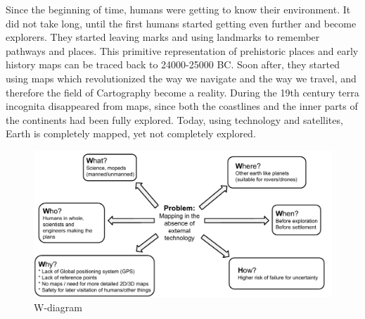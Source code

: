 Since the beginning of time, humans were getting to know their environment. It did not take long, until the first humans started getting even further and become explorers. They started leaving marks and using landmarks to remember pathways and places. This primitive representation of prehistoric places and early history maps can be traced back to 24000-25000 BC. Soon after, they started using maps which revolutionized the way we navigate and the way we travel, and therefore the field of Cartography become a reality. During the 19th century terra incognita disappeared from maps, since both the coastlines and the inner parts of the continents had been fully explored. Today, using technology and satellites, Earth is completely mapped, yet not completely explored.


\begin{figure}[!htb]
	\centering
	\includegraphics[scale=.7]{images/wdiagram1.pdf}
	\caption{W-diagram}
	\label{fig:wdiagram}
\end{figure}

